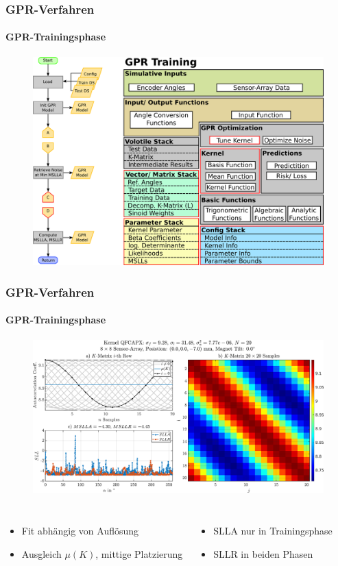 \documentclass{beamer}
\begin{document}
\begin{frame}
\frametitle{GPR-Verfahren}
\framesubtitle{GPR-Trainingsphase}
\begin{figure}
	\begin{overprint}
		\centering\includegraphics[width=.8\linewidth]{images/GPR_Trainingsphase-6}
	\end{overprint}
\end{figure}
\end{frame}
\begin{frame}
\frametitle{GPR-Verfahren}
\framesubtitle{GPR-Trainingsphase}
\begin{figure}
	\includegraphics[width=.9\linewidth]{images/K-Matrix}
\end{figure}
\begin{columns}[c]
	\begin{itemize}
		\item<1-> Fit abhängig von Auflösung
		\item<2-> Ausgleich $\mu(K)$, mittige Platzierung
	\end{itemize}

	\begin{itemize}
		\item<3-> SLLA nur in Trainingsphase
		\item<4-> SLLR in beiden Phasen
	\end{itemize}
\end{columns}
\end{frame}
\end{document}
